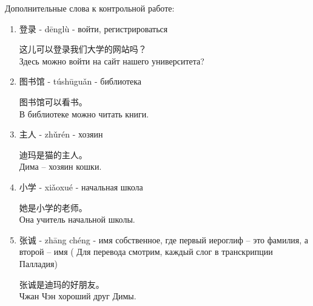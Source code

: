Дополнительные слова к контрольной работе:
\begin{enumerate}
	\item 登录 - dēnglù - войти, регистрироваться
	\begin{example}
		这儿可以登录我们大学的网站吗？\\
		Здесь можно войти на сайт нашего университета?
	\end{example}
	\item 图书馆 - túshūguǎn - библиотека
	\begin{example}
		图书馆可以看书。\\
		В библиотеке можно читать книги.
	\end{example}
	\item 主人 - zhǔrén - хозяин
	\begin{example}
		迪玛是猫的主人。\\
		Дима – хозяин кошки.\\
	\end{example}
	\item 小学 - xiǎoxué - начальная школа
	\begin{example}
		她是小学的老师。\\
		Она учитель начальной школы.
	\end{example}
	\item 张诚 - zhāng chéng - имя собственное, где первый иероглиф – это фамилия, а второй – имя ( Для перевода смотрим, каждый слог в транскрипции Палладия)
	\begin{example}
		张诚是迪玛的好朋友。\\
		Чжан Чэн хороший друг Димы.
	\end{example}
\end{enumerate}
